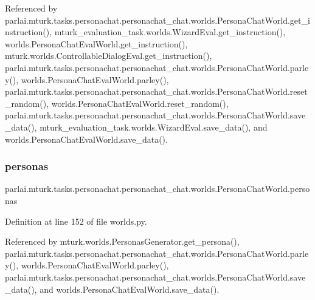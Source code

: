 Referenced by parlai.\+mturk.\+tasks.\+personachat.\+personachat\+\_\+chat.\+worlds.\+Persona\+Chat\+World.\+get\+\_\+instruction(), mturk\+\_\+evaluation\+\_\+task.\+worlds.\+Wizard\+Eval.\+get\+\_\+instruction(), worlds.\+Persona\+Chat\+Eval\+World.\+get\+\_\+instruction(), mturk.\+worlds.\+Controllable\+Dialog\+Eval.\+get\+\_\+instruction(), parlai.\+mturk.\+tasks.\+personachat.\+personachat\+\_\+chat.\+worlds.\+Persona\+Chat\+World.\+parley(), worlds.\+Persona\+Chat\+Eval\+World.\+parley(), parlai.\+mturk.\+tasks.\+personachat.\+personachat\+\_\+chat.\+worlds.\+Persona\+Chat\+World.\+reset\+\_\+random(), worlds.\+Persona\+Chat\+Eval\+World.\+reset\+\_\+random(), parlai.\+mturk.\+tasks.\+personachat.\+personachat\+\_\+chat.\+worlds.\+Persona\+Chat\+World.\+save\+\_\+data(), mturk\+\_\+evaluation\+\_\+task.\+worlds.\+Wizard\+Eval.\+save\+\_\+data(), and worlds.\+Persona\+Chat\+Eval\+World.\+save\+\_\+data().

\mbox{\label{classparlai_1_1mturk_1_1tasks_1_1personachat_1_1personachat__chat_1_1worlds_1_1PersonaChatWorld_a956a563f5690d02a40ad90028b773c24}} 
\subsubsection{\texorpdfstring{personas}{personas}}
{\footnotesize\ttfamily parlai.\+mturk.\+tasks.\+personachat.\+personachat\+\_\+chat.\+worlds.\+Persona\+Chat\+World.\+personas}



Definition at line 152 of file worlds.\+py.



Referenced by mturk.\+worlds.\+Personas\+Generator.\+get\+\_\+persona(), parlai.\+mturk.\+tasks.\+personachat.\+personachat\+\_\+chat.\+worlds.\+Persona\+Chat\+World.\+parley(), worlds.\+Persona\+Chat\+Eval\+World.\+parley(), parlai.\+mturk.\+tasks.\+personachat.\+personachat\+\_\+chat.\+worlds.\+Persona\+Chat\+World.\+save\+\_\+data(), and worlds.\+Persona\+Chat\+Eval\+World.\+save\+\_\+data().

